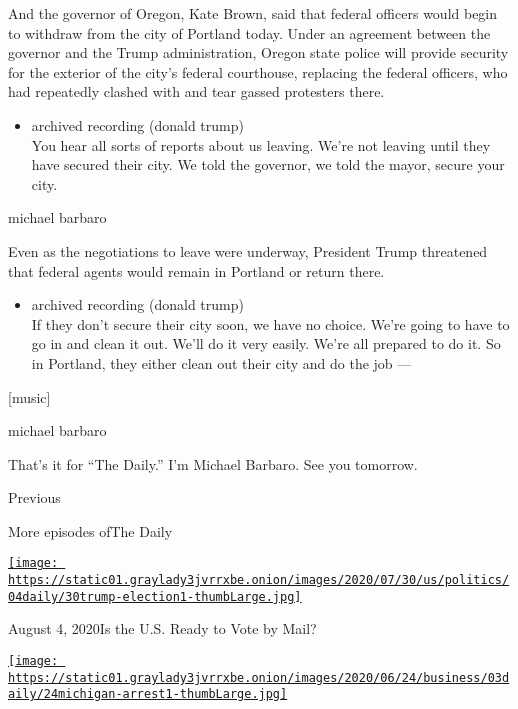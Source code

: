 And the governor of Oregon, Kate Brown, said that federal officers would
begin to withdraw from the city of Portland today. Under an agreement
between the governor and the Trump administration, Oregon state police
will provide security for the exterior of the city's federal courthouse,
replacing the federal officers, who had repeatedly clashed with and tear
gassed protesters there.

\begin{itemize}
\tightlist
\item
  archived recording (donald trump)\\
  You hear all sorts of reports about us leaving. We're not leaving
  until they have secured their city. We told the governor, we told the
  mayor, secure your city.
\end{itemize}

michael barbaro

Even as the negotiations to leave were underway, President Trump
threatened that federal agents would remain in Portland or return there.

\begin{itemize}
\tightlist
\item
  archived recording (donald trump)\\
  If they don't secure their city soon, we have no choice. We're going
  to have to go in and clean it out. We'll do it very easily. We're all
  prepared to do it. So in Portland, they either clean out their city
  and do the job ---
\end{itemize}

{[}music{]}

michael barbaro

That's it for ``The Daily.'' I'm Michael Barbaro. See you tomorrow.

Previous

More episodes ofThe Daily

\href{https://www.nytimes3xbfgragh.onion/2020/08/04/podcasts/the-daily/mail-in-voting-president-trump.html?action=click\&module=audio-series-bar\&region=header\&pgtype=Article}{\texttt{[image: https://static01.graylady3jvrrxbe.onion/images/2020/07/30/us/politics/04daily/30trump-election1-thumbLarge.jpg]}}

August 4, 2020Is the U.S. Ready to Vote by Mail?

\href{https://www.nytimes3xbfgragh.onion/2020/08/03/podcasts/the-daily/algorithmic-justice-racism.html?action=click\&module=audio-series-bar\&region=header\&pgtype=Article}{\texttt{[image: https://static01.graylady3jvrrxbe.onion/images/2020/06/24/business/03daily/24michigan-arrest1-thumbLarge.jpg]}}

